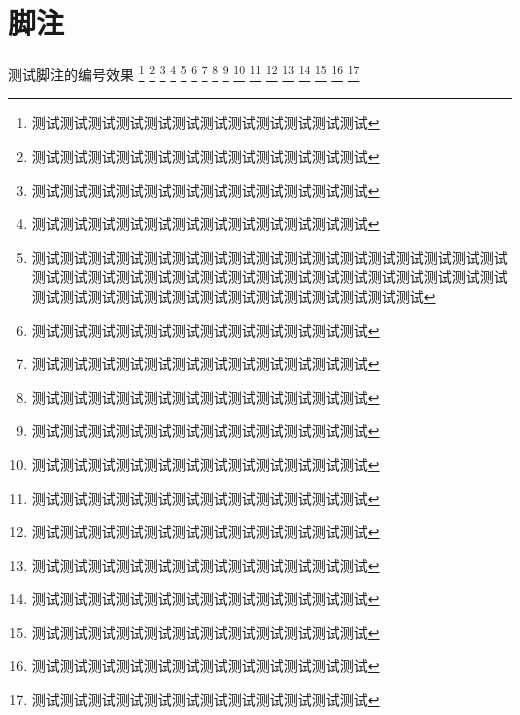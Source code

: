 \chapter{脚注}

测试脚注的编号效果%
\footnote{测试测试测试测试测试测试测试测试测试测试测试测试}%
\footnote{测试测试测试测试测试测试测试测试测试测试测试测试}%
\footnote{测试测试测试测试测试测试测试测试测试测试测试测试}%
\footnote{测试测试测试测试测试测试测试测试测试测试测试测试}%
\footnote{测试测试测试测试测试测试测试测试测试测试测试测试测试测试测试测试测试测试测试测试测试测试测试测试测试测试测试测试测试测试测试测试测试测试测试测试测试测试测试测试测试测试测试测试测试测试测试测试}%
\footnote{测试测试测试测试测试测试测试测试测试测试测试测试}%
\footnote{测试测试测试测试测试测试测试测试测试测试测试测试}%
\footnote{测试测试测试测试测试测试测试测试测试测试测试测试}%
\footnote{测试测试测试测试测试测试测试测试测试测试测试测试}%
\footnote{测试测试测试测试测试测试测试测试测试测试测试测试}%
\footnote{测试测试测试测试测试测试测试测试测试测试测试测试}%
\footnote{测试测试测试测试测试测试测试测试测试测试测试测试}%
\footnote{测试测试测试测试测试测试测试测试测试测试测试测试}%
\footnote{测试测试测试测试测试测试测试测试测试测试测试测试}%
\footnote{测试测试测试测试测试测试测试测试测试测试测试测试}%
\footnote{测试测试测试测试测试测试测试测试测试测试测试测试}%
\footnote{测试测试测试测试测试测试测试测试测试测试测试测试}%


% 



\bgroup
\sloppy
\printbibliography
\egroup



\appendix


% 


